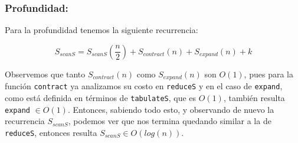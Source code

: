 \documentclass[11pt]{article}
\begin{document}
\subsubsection{Profundidad:}

Para la profundidad tenemos la siguiente recurrencia:

\begin{equation*}
    S_{scanS} = S_{scanS}(\frac{n}{2}) + S_{contract}(n) + S_{expand}(n) + k
\end{equation*}

Observemos que tanto $S_{contract}(n)$ como $S_{expand}(n)$ son $O(1)$, pues
para la función \texttt{contract} ya analizamos su costo en \texttt{reduceS} y en el 
caso de \texttt{expand}, como  está definida en términos de \texttt{tabulateS}, que
es $O(1)$, también resulta \texttt{expand} $\in O(1)$. Entonces, sabiendo todo esto, y observando de nuevo la recurrencia
$S_{scanS}$, podemos ver que nos termina quedando similar a la de \texttt{reduceS}, entonces 
resulta $S_{scanS} \in O(log(n))$.
\end{document}
